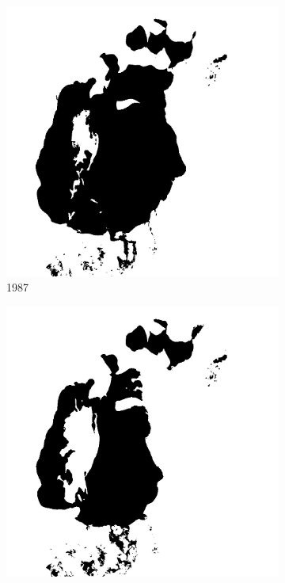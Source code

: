 \documentclass[12pt,a4paper]{article}
\begin{document}
\begin{figure}
\begin{subfigure}[b]{0.19\textwidth}
        \includegraphics[width=\textwidth]{../img/1987w.jpg}
        \caption{1987}
    \end{subfigure}
    \begin{subfigure}[b]{0.19\textwidth}
        \centering
        \includegraphics[width=\textwidth]{../img/1998w.jpg}

\end{subfigure}
\end{figure}
\end{document}
